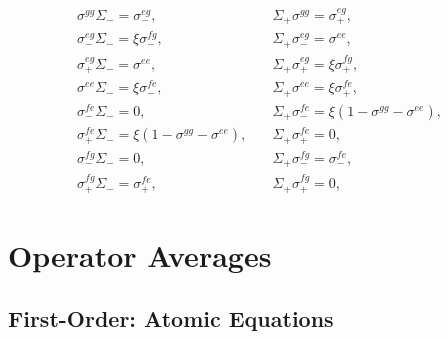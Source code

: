 \documentclass{article}
\begin{document}
\begin{subequations}
	\begin{align}
		\sigma^{gg} \Sigma_{-} = \sigma^{eg}_{-}, &\quad \Sigma_{+} \sigma^{gg} = \sigma^{eg}_{+}, \\
		\sigma^{eg}_{-} \Sigma_{-} =\xi \sigma^{fg}_{-} , &\quad \Sigma_{+} \sigma^{eg}_{-}  = \sigma^{ee} , \\
		\sigma^{eg}_{+} \Sigma_{-} = \sigma^{ee} , &\quad \Sigma_{+} \sigma^{eg}_{+} = \xi \sigma^{fg}_{+} , \\	
		\sigma^{ee} \Sigma_{-} = \xi \sigma_{-}^{fe}, &\quad \Sigma_{+} \sigma^{ee} = \xi \sigma^{fe}_{+}, \\
		\sigma^{fe}_{-} \Sigma_{-} = 0 , &\quad \Sigma_{+} \sigma^{fe}_{-} = \xi \left( 1 - \sigma^{gg} - \sigma^{ee} \right) , \\
		\sigma^{fe}_{+} \Sigma_{-} = \xi \left( 1 - \sigma^{gg} - \sigma^{ee} \right) , &\quad \Sigma_{+} \sigma^{fe}_{+} = 0 , \\
		\sigma^{fg}_{-} \Sigma_{-} = 0 , &\quad \Sigma_{+} \sigma^{fg}_{-} = \sigma^{fe}_{-} , \\
		\sigma^{fg}_{+} \Sigma_{-} = \sigma^{fe}_{+} , &\quad \Sigma_{+} \sigma^{fg}_{+} = 0 , 
	\end{align}
\end{subequations}

\section{Operator Averages}

\subsection{First-Order: Atomic Equations}
\end{document}
